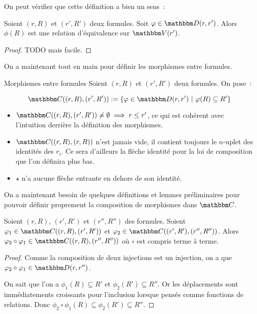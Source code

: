 On peut vérifier que cette définition a bien un sens~:

\begin{lem}
    Soient $(r,R)$ et $(r',R')$ deux formules. Soit $\phi\in\D(r,r')$.
    Alors $\phi(R)$ est une relation d'équivalence sur $\V(r')$.
\end{lem}

\begin{proof}
    TODO mais facile.
\end{proof}

On a maintenant tout en main pour définir les morphismes entre formules.

\begin{defi}{Morphismes entre formules}
    Soient $(r,R)$ et $(r',R')$ deux formules. On pose~:

    \[\C((r,R),(r',R')) := \{ \phi\in\D(r,r') ~|~ \phi(R)\subseteq R' \}\]
\end{defi}

\begin{rem}\begin{itemize}
    \item $\C((r,R), (r',R'))\neq\emptyset \implies r\leq r'$, ce qui est cohérent
        avec l'intuition derrière la définition des morphismes.
    \item $\C((r,R), (r,R))$ n'est jamais vide, il contient toujours le $n$-uplet
        des identités des $r_i$. Ce sera d'ailleurs la flèche identité pour la loi
        de composition que l'on définira plus bas.
    \item $\star$ n'a aucune flèche entrante en dehors de son identité.
\end{itemize}\end{rem}

On a maintenant besoin de quelques définitions et lemmes préliminaires pour pouvoir
définir proprement la composition de morphismes dans $\C$.

\begin{lem}
    Soient $(r,R)$, $(r',R')$ et $(r'',R'')$ des formules.
    Soient $\phi_1\in\C((r,R),(r',R'))$ et $\phi_2\in\C((r',R'),(r'',R''))$.
    Alors $\phi_2\circ\phi_1\in\C((r,R),(r'',R''))$ où $\circ$ est compris
    terme à terme.
\end{lem}

\begin{proof}
    Comme la composition de deux injections est un injection, on a que
    $\phi_2\circ\phi_1\in\D(r,r'')$.

    On sait que l'on a $\phi_1(R)\subseteq R'$ et $\phi_2(R')\subseteq R''$. Or
    les déplacements sont immédiatements croissants pour l'inclusion lorsque pensés
    comme fonctions de relations.
    Donc $\phi_2\circ\phi_1(R)\subseteq\phi_2(R')\subseteq R''$.
\end{proof}

